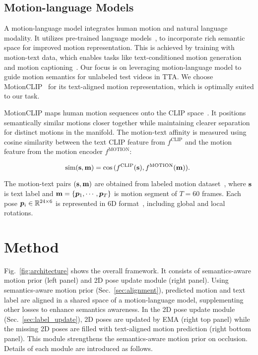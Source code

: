 \subsection{Motion-language Models}
A motion-language model 
integrates human motion and natural language modality.
{It utilizes pre-trained language models~\cite{gpt,bert}, to incorporate rich semantic space for improved motion representation. 
This is achieved by training with motion-text data, which enables tasks like text-conditioned motion generation~\cite{zhang2022motiondiffuse,zhang2023generating} and motion captioning~\cite{guo2022tm2t,motiongpt}. 
Our focus is on leveraging motion-language model to 
guide motion semantics for unlabeled test videos in TTA. 
We choose  
MotionCLIP~\cite{motionclip} for its text-aligned motion representation, which is optimally suited to our task.} 

MotionCLIP maps human motion sequences onto the CLIP space~\cite{clip}. It positions semantically similar motions closer together while maintaining clearer separation for distinct motions in the manifold. 
The motion-text affinity is measured using cosine similarity  
between the text CLIP feature from $f^{\text{CLIP}}$ and the motion feature from the motion encoder $f^{\text{MOTION}}$:

\begin{equation} 
    \text{sim}({\mathbf{s}},{\mathbf{m}}) = \cos{(f^{\text{CLIP}}({\mathbf{s}}), f^{\text{MOTION}}({\mathbf{m}}))}.
    ~\label{Eq:motionclip_loss}
\end{equation}

The motion-text pairs $({\mathbf{s}}, {\mathbf{m}})$ are obtained from labeled motion dataset~\cite{BABEL}, where ${\mathbf{s}}$ is text label and ${\mathbf{m}}=\{\bm{p}_1,\cdots, {\bm{p}}_T\}$ is motion segment of $T=60$ frames. Each pose ${\bm{p}}_i\in{\mathbb{R}}^{24\times6}$ is represented in 6D format~\cite{shi2019two}, including global and local rotations.

\section{Method}


{Fig.~\ref{fig:architecture} shows the overall framework. It consists of 
semantics-aware motion prior (left panel) 
and 2D pose update module (right panel). Using semantics-aware motion prior (Sec.~\ref{sec:alignment}), predicted motion and text label are aligned in a shared space of a motion-language model, supplementing other losses to enhance semantics awareness. In the 2D pose update module (Sec.~\ref{sec:label_update}), 2D poses are updated by EMA (right top panel) while the missing 2D poses are filled with text-aligned motion prediction (right bottom panel). 
This module strengthens the semantics-aware motion prior on occlusion. Details of each module are introduced as follows.}

